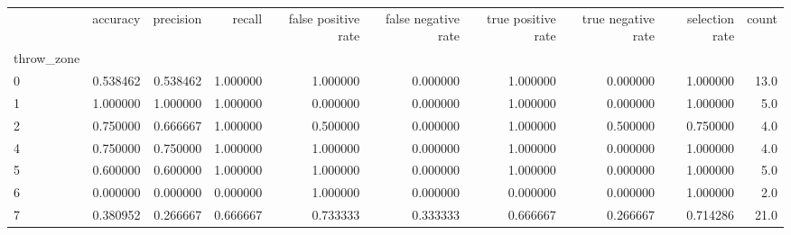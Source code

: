 \begin{tabular}{lrrrrrrrrr}
\toprule
{} &  accuracy &  precision &    recall &  false positive rate &  false negative rate &  true positive rate &  true negative rate &  selection rate &  count \\
throw\_zone &           &            &           &                      &                      &                     &                     &                 &        \\
\midrule
0          &  0.538462 &   0.538462 &  1.000000 &             1.000000 &             0.000000 &            1.000000 &            0.000000 &        1.000000 &   13.0 \\
1          &  1.000000 &   1.000000 &  1.000000 &             0.000000 &             0.000000 &            1.000000 &            0.000000 &        1.000000 &    5.0 \\
2          &  0.750000 &   0.666667 &  1.000000 &             0.500000 &             0.000000 &            1.000000 &            0.500000 &        0.750000 &    4.0 \\
4          &  0.750000 &   0.750000 &  1.000000 &             1.000000 &             0.000000 &            1.000000 &            0.000000 &        1.000000 &    4.0 \\
5          &  0.600000 &   0.600000 &  1.000000 &             1.000000 &             0.000000 &            1.000000 &            0.000000 &        1.000000 &    5.0 \\
6          &  0.000000 &   0.000000 &  0.000000 &             1.000000 &             0.000000 &            0.000000 &            0.000000 &        1.000000 &    2.0 \\
7          &  0.380952 &   0.266667 &  0.666667 &             0.733333 &             0.333333 &            0.666667 &            0.266667 &        0.714286 &   21.0 \\
\bottomrule
\end{tabular}
